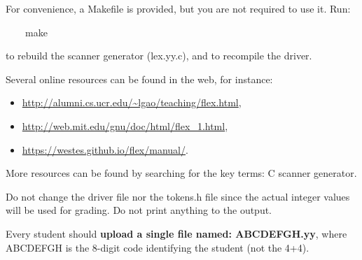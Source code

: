 \documentclass[letter,10pt]{article}
\begin{document}
For convenience, a Makefile is provided, but you are not required to use it.
Run: 

~~~~make

to rebuild the scanner generator (lex.yy.c), and to recompile the driver.

Several online resources can be found in the web, for instance:
\begin{itemize}
\item
\url{http://alumni.cs.ucr.edu/~lgao/teaching/flex.html}, 
\item
\url{http://web.mit.edu/gnu/doc/html/flex_1.html},
\item
\url{https://westes.github.io/flex/manual/}.
\end{itemize}

More resources can be found by searching for the key terms: C scanner generator.

Do not change the driver file nor the tokens.h file since the actual integer values will be used for grading. Do not print anything to the output.

Every student should {\bf upload a single file named: ABCDEFGH.yy}, where ABCDEFGH is the 8-digit code identifying the student (not the 4+4).
\end{document}
